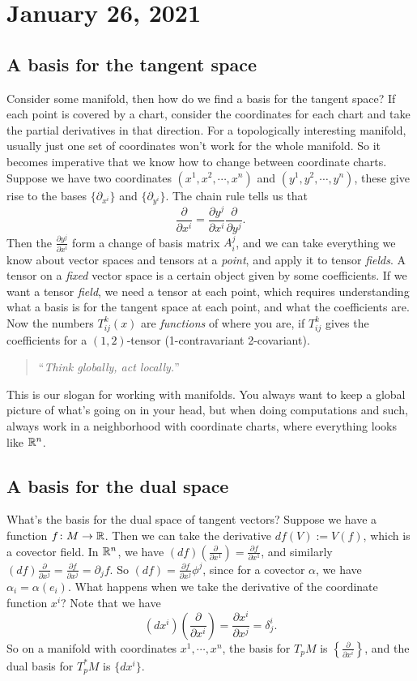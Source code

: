 \section{January 26, 2021}
\subsection{A basis for the tangent space}
Consider some manifold, then how do we find a basis for the tangent space? If each point is covered by a chart, consider the coordinates for each chart and take the partial derivatives in that direction. For a topologically interesting manifold, usually just one set of coordinates won't work for the whole manifold. So it becomes imperative that we know how to change between coordinate charts. Suppose we have two coordinates $(x^1,x^2,\cdots ,x^n )$ and $(y^1,y^2,\cdots ,y^n )$, these give rise to the bases $\{\partial _{x^i }\} $ and $\{ \partial _{y^i }\}$. The chain rule tells us that \[
\frac{\partial}{\partial x^i }=\frac{\partial y^j }{\partial x^i }\frac{\partial}{\partial y^j }.
\] Then the $\frac{\partial y^j }{\partial x^i }$ form a change of basis matrix $A^j _i $, and we can take everything we know about vector spaces and tensors at a \emph{point}, and apply it to tensor \emph{fields}. A tensor on a \emph{fixed} vector space is a certain object given by some coefficients. If we want a tensor \emph{field}, we need a tensor at each point, which requires understanding what a basis is for the tangent space at each point, and what the coefficients are. Now the numbers $T_{ij}^k(x)$ are \emph{functions} of where you are, if $T_{ij}^k$ gives the coefficients for a $(1,2)$-tensor (1-contravariant 2-covariant). 
\begin{quote}
    ``\emph{Think globally, act locally.}''
\end{quote}This is our slogan for working with manifolds. You always want to keep a global picture of what's going on in your head, but when doing computations and such, always work in a neighborhood with coordinate charts, where everything looks like $\mathbb{R}^n $.

\subsection{A basis for the dual space}
What's the basis for the dual space of tangent vectors? Suppose we have a function $f \colon M \to \mathbb{R}$. Then we can take the derivative $df(V):=V(f)$, which is a covector field. In $\mathbb{R}^n $, we have $(df) \left( \frac{\partial }{\partial x^1} \right) = \frac{\partial f}{\partial x^1}$, and similarly $(df)\frac{\partial }{\partial x^j }= \frac{\partial f}{\partial x^j }=\partial _j f$. So $(df) = \frac{\partial f}{\partial x^j }\phi ^j $, since for a covector $\alpha $, we have $\alpha _i =\alpha (e_i )$. What happens when we take the derivative of the coordinate function $x^i $? Note that we have 
\[
(dx^i ) \left( \frac{\partial }{\partial x^i } \right) = \frac{\partial x^i }{\partial x^j }=\delta ^i _j .
\] 
 So on a manifold with coordinates $x^1,\cdots , x^n $, the basis for $T_pM$ is $\left\{\frac{\partial }{\partial x^i }\right\} $, and the dual basis for $T_p^*M$ is $\{dx^i \} $. 

